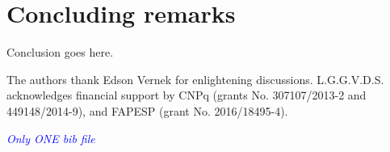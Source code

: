 \documentclass[showpacs,aps,prb,reprint,superscriptaddress]{revtex4-1}
\newcommand{\LUIS}[1]{\textcolor{blue}{\fbox{Luis} {\sl#1}}}
\begin{document}






    
\section{Concluding remarks}
\label{sec:Conclusions}

Conclusion goes here.

\begin{acknowledgments}
The authors thank Edson Vernek for enlightening discussions.  L.G.G.V.D.S. acknowledges financial support by CNPq (grants No. 307107/2013-2 and 449148/2014-9), and FAPESP (grant No. 2016/18495-4).
\end{acknowledgments}

\LUIS{Only ONE bib file}




%

\end{document}
